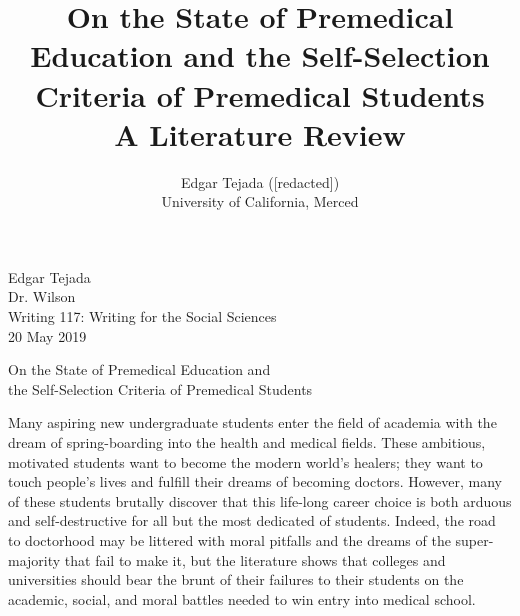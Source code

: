 \documentclass [12pt]{article}
\title{On the State of Premedical Education and the Self-Selection Criteria of Premedical Students \\\medskip A Literature Review}
\author{Edgar Tejada ([redacted])\\University of California, Merced}
\begin{document}
	\begin{flushleft}
Edgar Tejada\\
Dr. Wilson\\
Writing 117: Writing for the Social Sciences\\
20 May 2019\\


\begin{center}
	On the State of Premedical Education and \\the Self-Selection Criteria of Premedical Students
\end{center}


\setlength{\parindent}{0.5in}
Many aspiring new undergraduate students enter the field of academia with the dream of spring-boarding into the health and medical fields. These ambitious, motivated students want to become the modern world's healers; they want to touch people's lives and fulfill their dreams of becoming doctors. However, many of these students brutally discover that this life-long career choice is both arduous and self-destructive for all but the most dedicated of students. Indeed, the road to doctorhood may be littered with moral pitfalls and the dreams of the super-majority that fail to make it, but the literature shows that colleges and universities should bear the brunt of their failures to their students on the academic, social, and moral battles needed to win entry into medical school.


\end{flushleft}
\end{document}
